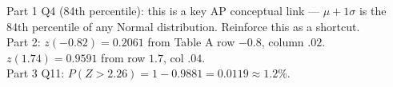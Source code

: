 \documentclass[10pt]{article}
\begin{document}
\begin{teachernote}
Part 1 Q4 (84th percentile): this is a key AP conceptual link — $\mu + 1\sigma$ is the 84th percentile of any Normal distribution. Reinforce this as a shortcut.\\
Part 2: $z(-0.82) = 0.2061$ from Table A row $-0.8$, column $.02$. $z(1.74) = 0.9591$ from row $1.7$, col $.04$.\\
Part 3 Q11: $P(Z > 2.26) = 1 - 0.9881 = 0.0119 \approx 1.2\%$.
\end{teachernote}
\end{document}
